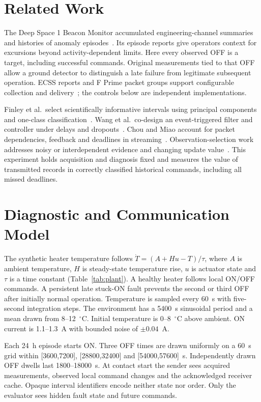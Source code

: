 \documentclass[a4paper]{llncs}
\begin{document}
\section{Related Work}

The Deep Space 1 Beacon Monitor accumulated engineering-channel summaries and histories of anomaly episodes~\cite{sherwood2000}. Its episode reports give operators context for excursions beyond activity-dependent limits. Here every observed OFF is a target, including successful commands. Original measurements tied to that OFF allow a ground detector to distinguish a late failure from legitimate subsequent operation. ECSS reports and F Prime packet groups support configurable collection and delivery~\cite{ecss2016,fprime}; the controls below are independent implementations.

Finley et al.\ select scientifically informative intervals using principal components and one-class classification~\cite{finley2024}. Wang et al.\ co-design an event-triggered filter and controller under delays and dropouts~\cite{wang2016}. Chou and Miao account for packet dependencies, feedback and deadlines in streaming~\cite{chou2006}. Observation-selection work addresses noisy or interdependent evidence and changing update value~\cite{krause2009,chen2017,singh2019}. This experiment holds acquisition and diagnosis fixed and measures the value of transmitted records in correctly classified historical commands, including all missed deadlines.

\section{Diagnostic and Communication Model}

The synthetic heater temperature follows $\dot T=(A+Hu-T)/\tau$, where $A$ is ambient temperature, $H$ is steady-state temperature rise, $u$ is actuator state and $\tau$ is a time constant (Table~\ref{tab:plant}). A healthy heater follows local ON/OFF commands. A persistent late stuck-ON fault prevents the second or third OFF after initially normal operation. Temperature is sampled every 60~s with five-second integration steps. The environment has a 5400~s sinusoidal period and a mean drawn from 8--12~$^\circ$C. Initial temperature is 0--8~$^\circ$C above ambient. ON current is 1.1--1.3~A with bounded noise of $\pm0.04$~A.


Each 24~h episode starts ON. Three OFF times are drawn uniformly on a 60~s grid within [3600,7200], [28800,32400] and [54000,57600]~s. Independently drawn OFF dwells last 1800--18000~s. At contact start the sender sees acquired measurements, observed local command changes and the acknowledged receiver cache. Opaque interval identifiers encode neither state nor order. Only the evaluator sees hidden fault state and future commands.
\end{document}
